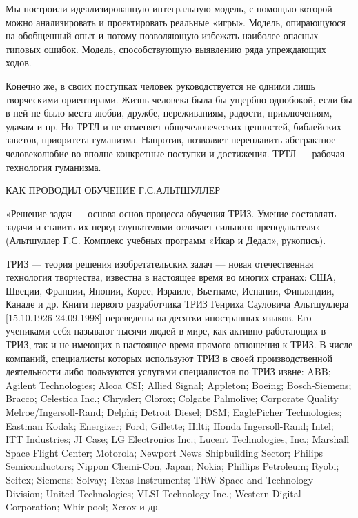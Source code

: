 Мы построили  идеализированную интегральную модель, с  помощью которой
можно   анализировать  и   проектировать   реальные  «игры».   Модель,
опирающуюся на обобщенный опыт  и потому позволяющую избежать наиболее
опасных   типовых  ошибок.   Модель,  способствующую   выявлению  ряда
упреждающих ходов.


Конечно же, в  своих поступках человек руководствуется  не одними лишь
творческими  ориентирами. Жизнь  человека была  бы ущербно  однобокой,
если  бы в  ней не  было места  любви, дружбе,  переживаниям, радости,
приключениям,  удачам и  пр. Но  ТРТЛ и  не отменяет  общечеловеческих
ценностей,   библейских  заветов,   приоритета  гуманизма.   Напротив,
позволяет переплавить  абстрактное человеколюбие во  вполне конкретные
поступки и достижения. ТРТЛ — рабочая технология гуманизма.


КАК ПРОВОДИЛ ОБУЧЕНИЕ Г.С.АЛЬТШУЛЛЕР

«Решение  задач   —  основа  основ  процесса   обучения  ТРИЗ.  Умение
составлять  задачи и  ставить их  перед слушателями  отличает сильного
преподавателя»  (Альтшуллер Г.С.  Комплекс  учебных  программ «Икар  и
Дедал», рукопись).

ТРИЗ  — теория  решения изобретательских  задач —  новая отечественная
технология творчества,  известна в настоящее время  во многих странах:
США,  Швеции,  Франции,  Японии, Корее,  Израиле,  Вьетнаме,  Испании,
Финляндии,  Канаде  и  др.  Книги первого  разработчика  ТРИЗ  Генриха
Сауловича  Альтшуллера [15.10.1926-24.09.1998]  переведены на  десятки
иностранных языков. Его  учениками себя называют тысячи  людей в мире,
как активно  работающих в  ТРИЗ, так  и не  имеющих в  настоящее время
прямого  отношения  к  ТРИЗ.  В числе  компаний,  специалисты  которых
используют ТРИЗ в своей  производственной деятельности либо пользуются
услугами  специалистов  по  ТРИЗ  извне:  ABB;  Agilent  Technologies;
Alcoa  CSI; Allied  Signal; Appleton;  Boeing; Bosch-Siemens;  Bracco;
Celestica Inc.; Chrysler; Clorox; Colgate Palmolive; Corporate Quality
Melroe/Ingersoll-Rand;  Delphi;   Detroit  Diesel;   DSM;  EaglePicher
Technologies; Eastman  Kodak; Energizer; Ford; Gillette;  Hilti; Honda
Ingersoll-Rand; Intel;  ITT Industries; JI Case;  LG Electronics Inc.;
Lucent  Technologies, Inc.;  Marshall Space  Flight Center;  Motorola;
Newport  News  Shipbuilding  Sector;  Philips  Semiconductors;  Nippon
Chemi-Con, Japan;  Nokia; Phillips Petroleum; Ryobi;  Scitex; Siemens;
Solvay; Texas  Instruments; TRW Space and  Technology Division; United
Technologies;  VLSI  Technology  Inc.;  Western  Digital  Corporation;
Whirlpool; Xerox и др.

